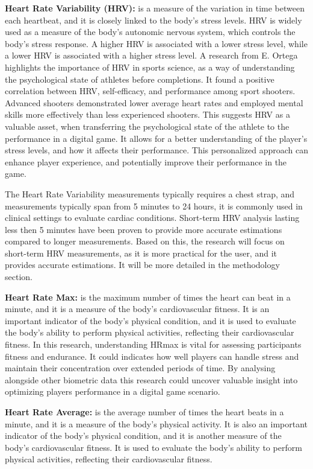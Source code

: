 \textbf{Heart Rate Variability (HRV):} is a measure of the variation in time between each heartbeat, and it is closely linked to
the body's stress levels. HRV is widely used as a measure of the body's autonomic nervous system, which controls the body's stress
response. A higher HRV is associated with a lower stress level, while a lower HRV is associated with a higher stress level. A research
from E. Ortega\cite{ortega2018pre} highlights the importance of HRV in sports science, as a way of understanding the psychological
state of athletes before completions. It found a positive correlation between HRV, self-efficacy, and performance among sport shooters.
Advanced shooters demonstrated lower average heart rates and employed mental skills more effectively than less experienced shooters.
This suggests HRV as a valuable asset, when transferring the psychological state of the athlete to the performance in a digital game.
It allows for a better understanding of the player's stress levels, and how it affects their performance. This personalized approach
can enhance player experience, and potentially improve their performance in the game.

The Heart Rate Variability measurements typically requires a chest strap, and measurements typically span from 5 minutes to 24 hours,
it is commonly used in clinical settings to evaluate cardiac conditions.\cite{malik1996heart} Short-term HRV analysis lasting less then
5 minutes have been proven to provide more accurate estimations compared to longer measurements.\cite{mcnames2006reliability}
Based on this, the research will focus on short-term HRV measurements, as it is more practical for the user, and it provides accurate
estimations. It will be more detailed in the methodology section.

\textbf{Heart Rate Max:} is the maximum number of times the heart can beat in a minute, and it is a measure of the body's
cardiovascular fitness. It is an important indicator of the body's physical condition, and it is used to evaluate the body's ability
to perform physical activities, reflecting their cardiovascular fitness. In this research, understanding HRmax is vital for assessing
participants fitness and endurance. It could indicates how well players can handle stress and maintain their concentration over
extended periods of time. By analysing alongside other biometric data this research could uncover valuable insight into optimizing
players performance in a digital game scenario.

\textbf{Heart Rate Average:} is the average number of times the heart beats in a minute, and it is a measure of the body's physical
activity. It is also an important indicator of the body's physical condition,     and it is another measure of the body's
cardiovascular fitness. It is used to evaluate the body's ability to perform physical activities, reflecting their cardiovascular
fitness.

